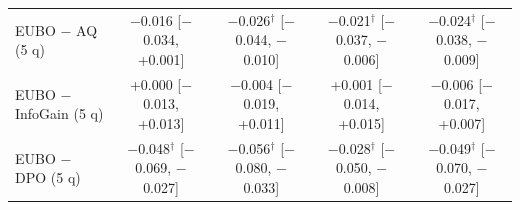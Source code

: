 \begin{table}[t]
{\begin{tabular}{lcccc}
EUBO $-$ AQ (5 q) & $-$0.016 \scriptsize{[$-$0.034, +0.001]} & $-$0.026$^\dagger$ \scriptsize{[$-$0.044, $-$0.010]} & $-$0.021$^\dagger$ \scriptsize{[$-$0.037, $-$0.006]} & $-$0.024$^\dagger$ \scriptsize{[$-$0.038, $-$0.009]} \\
EUBO $-$ InfoGain (5 q) & +0.000 \scriptsize{[$-$0.013, +0.013]} & $-$0.004 \scriptsize{[$-$0.019, +0.011]} & +0.001 \scriptsize{[$-$0.014, +0.015]} & $-$0.006 \scriptsize{[$-$0.017, +0.007]} \\
EUBO $-$ DPO (5 q) & $-$0.048$^\dagger$ \scriptsize{[$-$0.069, $-$0.027]} & $-$0.056$^\dagger$ \scriptsize{[$-$0.080, $-$0.033]} & $-$0.028$^\dagger$ \scriptsize{[$-$0.050, $-$0.008]} & $-$0.049$^\dagger$ \scriptsize{[$-$0.070, $-$0.027]} \\
\bottomrule
\end{tabular}
}
\end{table}
